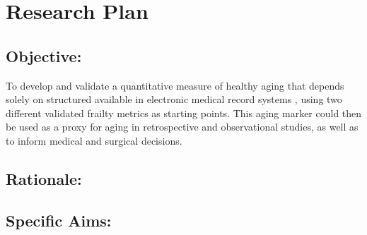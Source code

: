 \section{Research Plan }\label{research-plan}


\subsection{Objective:}\label{objective}
  
To develop and validate a quantitative measure of healthy aging that depends solely on structured  available in electronic medical record systems ,
using two different validated frailty metrics as starting points. This
aging marker could then be used as a proxy for aging in retrospective
and observational studies, as well as to inform medical and surgical
decisions.


\subsection{Rationale:}\label{rationale}

\subsection{Specific Aims:}\label{specific-aims}
